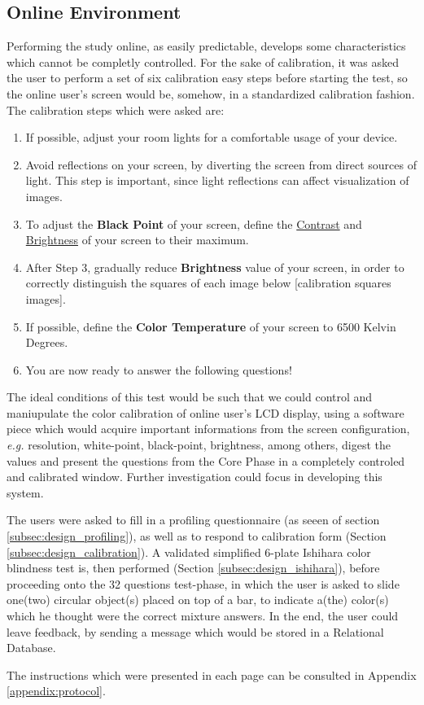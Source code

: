 \subsection{Online Environment}
%
Performing the study online, as easily predictable, develops some characteristics which cannot be completly controlled. For the sake of calibration, it was asked the user
to perform a set of six calibration easy steps before starting the test, so the online user's screen would be,
somehow, in a standardized calibration fashion. The calibration steps which were asked are:
%
\begin{enumerate}
  \item If possible, adjust your room lights for a comfortable usage of your device.
  \item Avoid reflections on your screen, by diverting the screen from direct sources of light. This step is important,
  since light reflections can affect visualization of images.
  \item To adjust the \textbf{Black Point} of your screen, define the \ul{Contrast} and \ul{Brightness} of your screen to their maximum.
  \item After Step 3, gradually reduce \textbf{Brightness} value of your screen, in order to correctly distinguish the squares of each image below [calibration squares images].
  \item If possible, define the \textbf{Color Temperature} of your screen to 6500 Kelvin Degrees.
  \item You are now ready to answer the following questions!
\end{enumerate} \par
%
The ideal conditions of this test would be such that we could control and maniupulate the color calibration of online user's LCD display, using a software
piece which would acquire important informations from the screen configuration, \emph{e.g.} resolution, white-point, black-point, brightness, among others,
digest the values and present the questions from the Core Phase in a completely controled and calibrated window. Further investigation could focus in
developing this system. \par
%
The users were asked to fill in a profiling questionnaire (as seeen of section \ref{subsec:design_profiling}), as well as to respond to calibration form
(Section \ref{subsec:design_calibration}). A validated simplified 6-plate Ishihara color blindness test \cite{Alwis1992} is, then performed
(Section \ref{subsec:design_ishihara}), before proceeding onto the 32 questions test-phase, in which the user is asked to slide one(two) circular
object(s) placed on top of a bar, to indicate a(the) color(s) which he thought were the correct mixture answers. In the end, the user could leave
feedback, by sending a message which would be stored in a Relational Database. \par
%
The instructions which were presented in each page can be consulted in Appendix \ref{appendix:protocol}. \par
%
